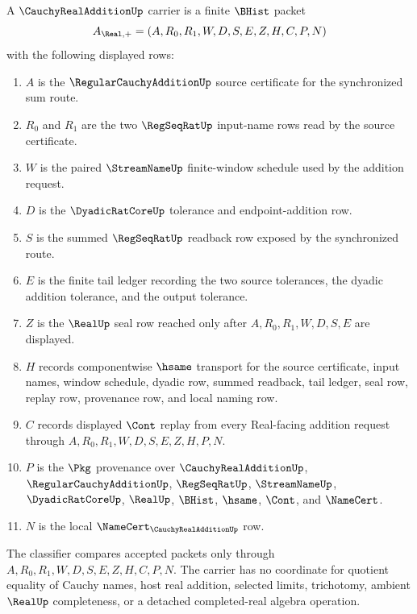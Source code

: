 \begin{definition}
\label{def:cauchy-real-addition-carrier}
A $\CauchyRealAdditionUp$ carrier is a finite $\BHist$ packet
$$
A_{\Real,+}=(A,R_0,R_1,W,D,S,E,Z,H,C,P,N)
$$
with the following displayed rows:
\begin{enumerate}
\item $A$ is the $\RegularCauchyAdditionUp$ source certificate for the synchronized sum route.
\item $R_0$ and $R_1$ are the two $\RegSeqRatUp$ input-name rows read by the source certificate.
\item $W$ is the paired $\StreamNameUp$ finite-window schedule used by the addition request.
\item $D$ is the $\DyadicRatCoreUp$ tolerance and endpoint-addition row.
\item $S$ is the summed $\RegSeqRatUp$ readback row exposed by the synchronized route.
\item $E$ is the finite tail ledger recording the two source tolerances, the dyadic addition tolerance, and the output tolerance.
\item $Z$ is the $\RealUp$ seal row reached only after $A,R_0,R_1,W,D,S,E$ are displayed.
\item $H$ records componentwise $\hsame$ transport for the source certificate, input names, window schedule, dyadic row, summed readback, tail ledger, seal row, replay row, provenance row, and local naming row.
\item $C$ records displayed $\Cont$ replay from every Real-facing addition request through $A,R_0,R_1,W,D,S,E,Z,H,P,N$.
\item $P$ is the $\Pkg$ provenance over $\CauchyRealAdditionUp$, $\RegularCauchyAdditionUp$, $\RegSeqRatUp$, $\StreamNameUp$, $\DyadicRatCoreUp$, $\RealUp$, $\BHist$, $\hsame$, $\Cont$, and $\NameCert$.
\item $N$ is the local $\NameCert_{\CauchyRealAdditionUp}$ row.
\end{enumerate}
The classifier compares accepted packets only through $A,R_0,R_1,W,D,S,E,Z,H,C,P,N$. The carrier has no coordinate for quotient equality of Cauchy names, host real addition, selected limits, trichotomy, ambient $\RealUp$ completeness, or a detached completed-real algebra operation.
\end{definition}

